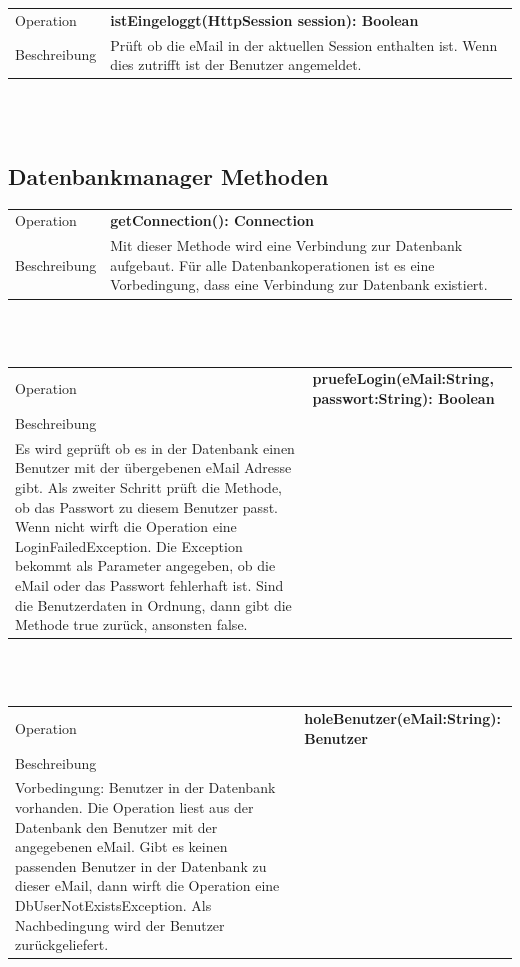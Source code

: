 \documentclass[12pt]{scrreprt}
\begin{document}
\begin{tabular}{|lp{12cm}|}
	\hline
	Operation &  \textbf{istEingeloggt(HttpSession session): Boolean }\\ 
	Beschreibung & Prüft ob die eMail in der aktuellen Session enthalten ist. Wenn dies zutrifft ist der Benutzer angemeldet.\\ 
	\hline 
\end{tabular} \\\\


\subsection{Datenbankmanager  Methoden}
\begin{tabular}{|lp{12cm}|}
	\hline
	Operation &  \textbf{getConnection(): Connection}\\ 
	Beschreibung & Mit dieser Methode wird eine Verbindung zur Datenbank aufgebaut. Für alle Datenbankoperationen ist es eine Vorbedingung, dass eine Verbindung zur Datenbank existiert. \\ 
	\hline 
\end{tabular} \\\\

\begin{tabular}{|lp{12cm}|}
	\hline
	Operation &  \textbf{pruefeLogin(eMail:String, passwort:String): Boolean}\\ 
	Beschreibung & \\ Es wird geprüft ob es in der Datenbank einen Benutzer mit der übergebenen eMail Adresse gibt. Als zweiter Schritt prüft die Methode, ob das Passwort zu diesem Benutzer passt. Wenn nicht wirft die Operation eine LoginFailedException. Die Exception bekommt als Parameter angegeben, ob die eMail oder das Passwort fehlerhaft ist. Sind die Benutzerdaten in Ordnung, dann gibt die Methode true zurück, ansonsten false.
	\hline 
\end{tabular} \\\\

\begin{tabular}{|lp{12cm}|}
	\hline
	Operation &  \textbf{holeBenutzer(eMail:String): Benutzer}\\ 
	Beschreibung & \\ Vorbedingung: Benutzer in der Datenbank vorhanden. Die Operation liest aus der Datenbank den Benutzer mit der angegebenen eMail. Gibt es keinen passenden Benutzer in der Datenbank zu dieser eMail, dann wirft die Operation eine DbUserNotExistsException. Als Nachbedingung wird der Benutzer zurückgeliefert.
	\hline 
\end{tabular} \\\\
\end{document}
